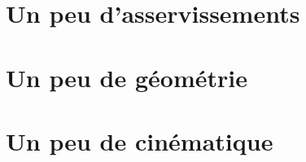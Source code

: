 \section*{Un peu d'asservissements}

\graphicspath{{\repStyle/png/}{\repAct/SLCI/SLCI-03-SchemaBlocs/51_MCC/images/}} 
 

\graphicspath{{\repStyle/png/}{\repAct/SLCI/SLCI-02-FT/51_MCC/images/}} 
 


\renewcommand{\nomExo}{510_02_Divers}
\graphicspath{{\repStyle/png/}{\repAct/SLCI/SLCI-11-DiagrammeBode/\nomExo/images/}} 
 

\renewcommand{\nomExo}{510_03_Divers}
\renewcommand{\repExo}{SLCI/SLCI-11-DiagrammeBode}
\graphicspath{{\repStyle/png/}{\repAct/\repExo/\nomExo/images/}} 
 

\renewcommand{\nomExo}{501_Divers}
\renewcommand{\repExo}{PERF/PERF-05-Precistion-TVF}
\graphicspath{{\repStyle/png/}{\repAct/\repExo/\nomExo/images/}} 
 

\renewcommand{\nomExo}{509_Divers}
\renewcommand{\repExo}{PERF/PERF-05-Precistion-TVF}
\graphicspath{{\repStyle/png/}{\repAct/\repExo/\nomExo/images/}} 
 

\newpage \clearpage 

\section*{Un peu de géométrie}
\renewcommand{\nomExo}{12_BielleManivelle}
\renewcommand{\repExo}{GEO/GEO-03}
\graphicspath{{\repStyle/png/}{\repAct/\repExo/\nomExo/images/}} 
 

\section*{Un peu de cinématique}
\renewcommand{\nomExo}{05_RT}
\renewcommand{\repExo}{CIN/CIN-02-VitesseAcceleration}
\graphicspath{{\repStyle/png/}{\repAct/\repExo/\nomExo/images/}} 
 

\renewcommand{\nomExo}{05_RT_02}
\renewcommand{\repExo}{CIN/CIN-02-VitesseAcceleration}
\graphicspath{{\repStyle/png/}{\repAct/\repExo/\nomExo/images/}} 
 

